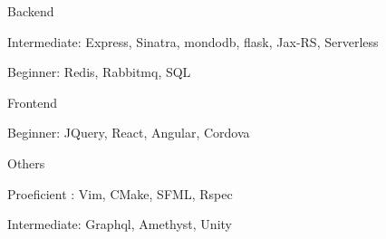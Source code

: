 \begin{cvskills}
  \cvskill
    {Backend} %
    {
      \begin{cvitems} %
        \item Intermediate:                 Express, Sinatra, mondodb, flask, Jax-RS, Serverless
        \item Beginner:\hspace{5mm}         Redis, Rabbitmq, SQL
      \end{cvitems}
    }
  \cvskill
    {Frontend} %
    {
      \begin{cvitems} %
      \item Beginner:\hspace{5mm}                     JQuery, React, Angular, Cordova
      \end{cvitems}
    }
  \cvskill
    {Others} %
    {
      \begin{cvitems} %
      \item Proeficient :\hspace{2.5mm}   Vim, CMake, SFML, Rspec
      \item Intermediate:\hspace{0.5mm} Graphql, Amethyst, Unity
      \end{cvitems}
    }


\end{cvskills}
